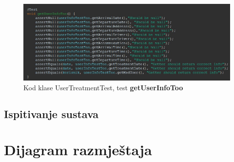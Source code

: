 			\begin{figure}[H]
				\includegraphics[width=\textwidth]{slike/userTreatmentInfoPtTree.JPG}
				\caption{Kod klase UserTreatmentTest, test \textbf{getUserInfoToo}}
				\label{UserTreatmentInfoTestPtTree}
			\end{figure}
			
			\subsection{Ispitivanje sustava}
			
			 
			
			\eject 
		
		
		\section{Dijagram razmještaja}

